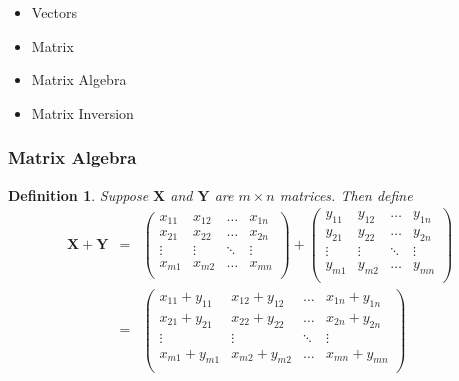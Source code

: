 \documentclass[handout]{beamer}
\newtheorem{defn}{Definition}
\numberwithin{equation}{section}
\begin{document}
\begin{frame}

\begin{itemize}
\item \textcolor{mygray}{Vectors}
\item \textcolor{mygray}{Matrix}
\item \textcolor{myblack}{Matrix Algebra}
\item \textcolor{mygray}{Matrix Inversion}
\end{itemize}

\end{frame}



\begin{frame}
\frametitle{Matrix Algebra}
\begin{defn} Suppose $\boldsymbol{X}$ and $\boldsymbol{Y} $ are $m \times n$ matrices.  Then define 
\begin{eqnarray} 
\boldsymbol{X} + \boldsymbol{Y} & = & \begin{pmatrix} 
x_{11} & x_{12} & \hdots & x_{1n} \\
x_{21} & x_{22} & \hdots & x_{2n} \\
\vdots & \vdots & \ddots & \vdots \\
x_{m1} & x_{m2} & \hdots & x_{mn} \\
\end{pmatrix} + 
\begin{pmatrix} 
y_{11} & y_{12} & \hdots & y_{1n} \\
y_{21} & y_{22} & \hdots & y_{2n} \\
\vdots & \vdots & \ddots & \vdots \\
y_{m1} & y_{m2} & \hdots & y_{mn} \\
\end{pmatrix}
\nonumber \\
& = & \begin{pmatrix} 
x_{11} + y_{11} & x_{12} + y_{12} & \hdots & x_{1n} + y_{1n} \\
x_{21} + y_{21} & x_{22} + y_{22} & \hdots & x_{2n} + y_{2n} \\
\vdots & \vdots & \ddots & \vdots\\
x_{m1} + y_{m1} & x_{m2} + y_{m2} & \hdots & x_{mn} + y_{mn} \\
\end{pmatrix} 
\nonumber 
\end{eqnarray}

\end{defn}

\end{frame}
\end{document}

